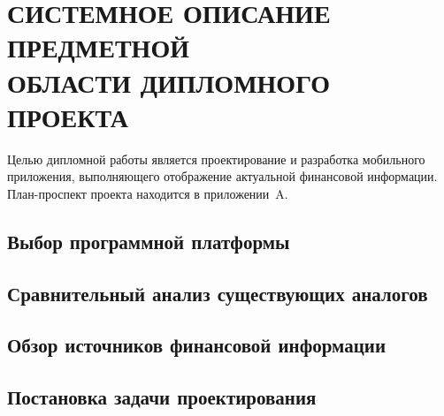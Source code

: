 \section[Системное описание предметной области дипломного проекта]{%
  СИСТЕМНОЕ ОПИСАНИЕ ПРЕДМЕТНОЙ \\
  ОБЛАСТИ ДИПЛОМНОГО ПРОЕКТА
}\label{sec:spec}

Целью дипломной работы является проектирование и
разработка мобильного приложения, выполняющего отображение актуальной
финансовой информации.
План-проспект проекта находится в приложении~A.

\subsection{Выбор программной платформы}

\subsection{Сравнительный анализ существующих аналогов}

\subsection{Обзор источников финансовой информации}

\subsection{Постановка задачи проектирования}

\pagebreak
